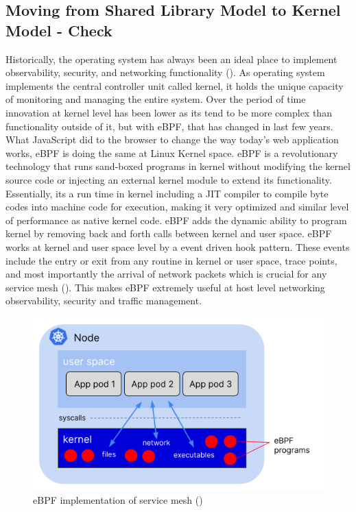 \subsection{Moving from Shared Library Model to Kernel Model - Check}
Historically, the operating system has always been an ideal place to implement observability, security, and networking functionality (\cite{ebpfIODocs}). As operating system implements the central controller unit called kernel, it holds the unique capacity of monitoring and managing the entire system. Over the period of time innovation at kernel level has been lower as its tend to be more complex than functionality outside of it, but with eBPF, that has changed in last few years. What JavaScript did to the browser to change the way today's web application works, eBPF is doing the same at Linux Kernel space. eBPF is a revolutionary technology that runs sand-boxed programs in kernel without modifying the kernel source code or injecting an external kernel module to extend its functionality. Essentially, its a run time in kernel including a JIT compiler to compile byte codes into machine code for execution, making it very optimized and similar level of performance as  native kernel code. eBPF adds the dynamic ability to program kernel by removing back and forth calls between kernel and user space. eBPF works at kernel and user space level by a event driven hook pattern. These events include the entry or exit from any routine in kernel or user space, trace points, and most importantly the arrival of network packets which is crucial for any service mesh (\cite{thenewstackRice2021}). This makes eBPF extremely useful at host level networking observability, security and traffic management.

\begin{figure}[ht!]
    \centering
    \includegraphics[width=0.7\linewidth]{resources/ebpf-service-mesh.png}
    \caption{eBPF implementation of service mesh (\cite{thenewstackRice2021})}
    \label{lr:ebpfDesign}
 \end{figure}


